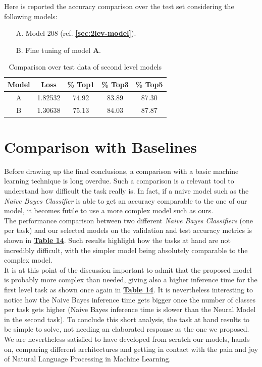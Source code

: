 \documentclass[12pt]{article}
\begin{document}
Here is reported the accuracy comparison over the test set considering the following models:
\begin{itemize}
    \item [A.] Model 208 (ref. \textbf{\ref{sec:2lev-model}}).
    \item [B.] Fine tuning of model \textbf{A}.
\end{itemize}
\begin{table}[ht!]
    \begin{adjustwidth}{}{}
	    \centering
	    \small
	    \begin{tabular}{ |c|c|c|c|c| }
        \hline
        \textbf{Model} & \textbf{Loss} & \textbf{\% Top1} & \textbf{\% Top3} & \textbf{\% Top5} \\
        \hline
        A & 1.82532 & 74.92 & 83.89 & 87.30 \\
        B & 1.30638 & 75.13 & 84.03 & 87.87 \\
        \hline
        \end{tabular}
        \captionsetup{justification = centering, singlelinecheck=false, margin=3cm}
	    \label{tb:finetuning}
    \end{adjustwidth}
    \caption{Comparison over test data of second level models}
\end{table}

\section{Comparison with Baselines}
Before drawing up the final conclusions, a comparison with a basic machine learning technique is long overdue. Such a comparison is a relevant tool to understand how difficult the task really is. In fact, if a naive model such as the \textit{Naive Bayes Classifier} is able to get an accuracy comparable to the one of our model, it becomes futile to use a more complex model such as ours.\\
The performance comparison between two different \textit{Naive Bayes Classifiers} (one per task) and our selected models on the validation and test accuracy metrics is shown in \hyperref[tb:baseline]{\textbf{Table 14}}. Such results highlight how the tasks at hand are not incredibly difficult, with the simpler model being absolutely comparable to the complex model.\\
It is at this point of the discussion important to admit that the proposed model is probably more complex than needed, giving also a higher inference time for the first level task as shown once again in \hyperref[tb:baseline]{\textbf{Table 14}}. It is nevertheless interesting to notice how the Naive Bayes inference time gets bigger once the number of classes per task gets higher (Naive Bayes inference time is slower than the Neural Model in the second task). To conclude this short analysis, the task at hand results to be simple to solve, not needing an elaborated response as the one we proposed. We are nevertheless satisfied to have developed from scratch our models, hands on, comparing different architectures and getting in contact with the pain and joy of Natural Language Processing in Machine Learning.
\end{document}
